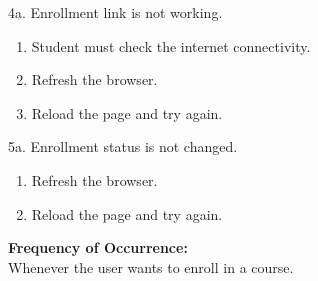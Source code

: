 \documentclass[12pt]{article}
\begin{document}
4a. Enrollment link is not working.
\begin{enumerate}
\item Student must check the internet connectivity.
\item Refresh the browser.
\item Reload the page and try again.
\end{enumerate}
5a. Enrollment status is not changed.
\begin{enumerate}
\item Refresh the browser.
\item Reload the page and try again.
\end{enumerate}
\textbf{Frequency of Occurrence:}\\
Whenever the user wants to enroll in a course.
\end{document}
